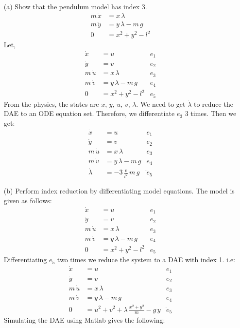 \begin{enumerate}
	\item[(a)] Show that the pendulum model has index 3.
	\begin{align*}
		m\,\ddot x &= x\,\lambda\\
		m\,\ddot y &= y\,\lambda - m\,g\\
		0 &= x^2 + y^2 - l^2		
	\end{align*}
	Let, 
	\begin{align*}
		\dot x &= u & e_1\\
		\dot y &= v & e_2\\
		m\,\dot u &= x\,\lambda & e_3\\
		m\,\dot v &= y\,\lambda - m\,g & e_4\\
		0 &= x^2 + y^2 - l^2 & e_5
	\end{align*}
	From the physics, the states are $x,\,y,\,u,\,v,\,\lambda$. We need to get $\dot\lambda$ to reduce the DAE to an ODE equation set. Therefore, we differentiate $e_3$ 3 times. Then we get:
	\begin{align*}
		\dot x &= u & e_1\\
		\dot y &= v & e_2\\
		m\,\dot u &= x\,\lambda & e_3\\
		m\,\dot v &= y\,\lambda - m\,g & e_4\\
		\dot \lambda &= -3\,\frac{v}{l^2}\,m\,g &  \dddot e_5
	\end{align*}
	\item[(b)] Perform index reduction by differentiating model equations.
	The model is given as follows:
	\begin{align*}
		\dot x &= u & e_1\\
		\dot y &= v & e_2\\
		m\,\dot u &= x\,\lambda & e_3\\
		m\,\dot v &= y\,\lambda - m\,g & e_4\\
		0 &= x^2 + y^2 - l^2 & e_5
	\end{align*}
	Differentiating $e_5$ two times we reduce the system to a DAE with index 1. i.e:
	\begin{align*}
		\dot x &= u & e_1\\
		\dot y &= v & e_2\\
		m\,\dot u &= x\,\lambda & e_3\\
		m\,\dot v &= y\,\lambda - m\,g & e_4\\
		0 &= u^2 + v^2 +\lambda\,\frac{x^2 + y^2}{m} - g\,y & \ddot e_5
	\end{align*}
	Simulating the DAE using Matlab gives the following:


\end{enumerate}
